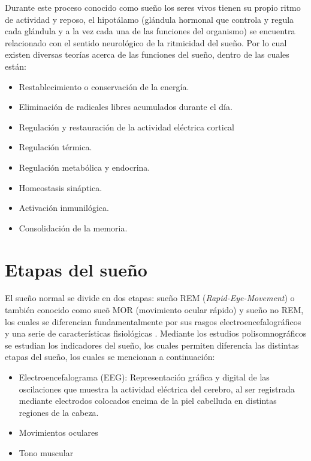 \documentclass[letterpaper,titlepage,12pt,draft]{report}
\begin{document}
Durante este proceso conocido como sue\~no los seres vivos tienen su propio ritmo de actividad y reposo, el hipot\'alamo (gl\'andula hormonal que controla y regula cada gl\'andula y a la vez cada una de las funciones del organismo) se encuentra relacionado con el sentido neurol\'ogico de la ritmicidad del sue\~no. Por lo cual existen diversas teor\'ias acerca de las funciones del sue\~no, dentro de las cuales est\'an:

\begin{itemize}
\item Restablecimiento o conservaci\'on de la energ\'ia.
\item Eliminaci\'on de radicales libres acumulados durante el d\'ia.
\item Regulaci\'on y restauraci\'on de la actividad el\'ectrica cortical
\item Regulaci\'on t\'ermica.
\item Regulaci\'on metab\'olica y endocrina.
\item Homeostasis sin\'aptica.
\item Activaci\'on inmunil\'ogica.
\item Consolidaci\'on de la memoria. 
\end{itemize}

\section{Etapas del sue\~no}

El sue\~no normal se divide en dos etapas: sue\~no REM (\textit{Rapid-Eye-Movement}) o tambi\'en conocido como sue\~o MOR (movimiento ocular r\'apido) y sue\~no no REM, los cuales se diferencian fundamentalmente por sus rasgos electroencefalogr\'aficos y una serie de caracter\'isticas fisiol\'ogicas \cite{et_sue}. Mediante los estudios polisomnogr\'aficos se estudian los indicadores del sue\~no, los cuales permiten diferencia las distintas etapas del sue\~no, los cuales se mencionan a continuaci\'on:

\begin{itemize}
\item Electroencefalograma (EEG): Representaci\'on gr\'afica y digital de las oscilaciones que muestra la actividad el\'ectrica del cerebro, al ser registrada mediante electrodos colocados encima de la piel cabelluda en distintas regiones de la cabeza.
\item Movimientos oculares
\item Tono muscular
\end{itemize}
\end{document}

